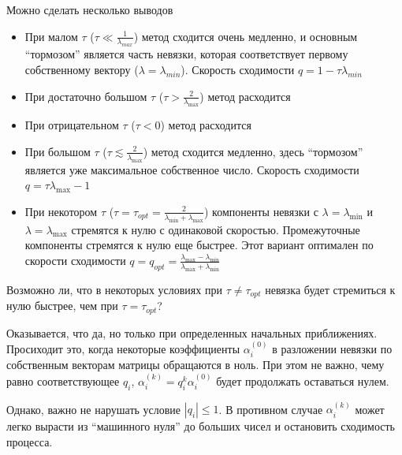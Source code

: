 \documentclass[professionalfonts,compress,unicode]{beamer}
\begin{document}
{
	Можно сделать несколько выводов
	\begin{itemize}
		\item При малом $\tau$ ($\tau \ll \frac{1}{\lambda_{max}}$) метод сходится очень медленно, и основным ``тормозом''
		является часть невязки, которая соответствует первому собственному вектору ($\lambda = \lambda_{min}$). Скорость сходимости
		$q = 1 - \tau \lambda_{min}$
		\item При достаточно большом $\tau$ ($\tau > \frac{2}{\lambda_{\max}}$) метод расходится
		\item При отрицательном $\tau$ ($\tau < 0$) метод расходится
		\item При большом $\tau$ ($\tau \lesssim \frac{2}{\lambda_{\max}}$) метод сходится медленно, здесь ``тормозом'' является уже
		максимальное собственное число. Скорость сходимости $q = \tau \lambda_{\max} - 1$
		\item При некотором $\tau$ ($\tau = \tau_{opt} = \frac{2}{\lambda_{\min}+\lambda_{\max}}$) 
        компоненты невязки с $\lambda = \lambda_{\min}$ и
		$\lambda = \lambda_{\max}$ стремятся к нулю с одинаковой скоростью. 
		Промежуточные компоненты стремятся к нулю еще быстрее. Этот вариант оптимален
		по скорости сходимости $q = q_{opt} = \frac{\lambda_{\max} -
        \lambda_{\min}}{\lambda_{\max} + \lambda_{\min}}$ 
	\end{itemize}
}

{  
    \begin{block}{}
    Возможно ли, что в некоторых условиях при $\tau \neq \tau_{opt}$ 
    невязка будет стремиться к нулю быстрее, чем при $\tau = \tau_{opt}$?
    \end{block}

    Оказывается, что да, но только при определенных начальных приближениях.
    Просиходит это, когда некоторые коэффициенты $\alpha^{(0)}_i$
    в разложении невязки по собственным векторам матрицы обращаются в 
    ноль. При этом не важно, чему равно соответствующее $q_i$,
    $\alpha^{(k)}_i = q_i^k \alpha^{(0)}_i$ будет продолжать оставаться нулем.

    Однако, важно не нарушать условие $|q_i| \leq 1$. В противном случае
    $\alpha^{(k)}_i$ может легко вырасти из ``машинного нуля'' до больших чисел
    и остановить сходимость процесса.
}
\end{document}
